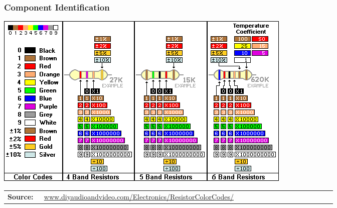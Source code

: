 \documentclass{beamer}
\begin{document}
	\begin{frame}
    \frametitle{Component Identification}
		\begin{center}
		\includegraphics[scale=0.65]{obr03_barevneZn.png}\\
		\begin{tabular}{p{0.1\linewidth} p{0.8\linewidth}}
			\tiny{\textbf{Source:}} 	& \tiny{\url{www.diyaudioandvideo.com/Electronics/ResistorColorCodes/}}\\
		\end{tabular}
		\end{center}
  \end{frame}
\end{document}

